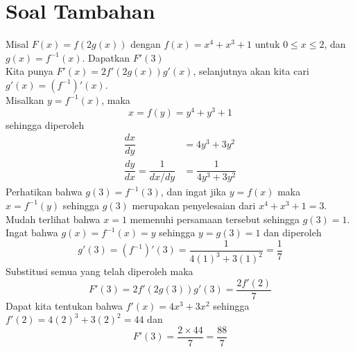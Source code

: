 \documentclass{article}
\begin{document}
\section*{Soal Tambahan}
Misal $F(x)=f(2g(x))$ dengan $f(x)=x^4+x^3+1$ untuk $0\leq x\leq 2$, dan $g(x)=f^{-1}(x)$. Dapatkan $F'(3)$\\
Kita punya $F'(x)=2f'(2g(x))g'(x)$, selanjutnya akan kita cari $g'(x)=(f^{-1})'(x)$. \\Misalkan $y=f^{-1}(x)$, maka $$ x=f(y)=y^4+y^3+1 $$
sehingga diperoleh
\begin{align*}
\dfrac{dx}{dy} &= 4y^3+3y^2\\
\dfrac{dy}{dx} = \dfrac{1}{dx/dy} &= \dfrac{1}{4y^3+3y^2}
\end{align*}
Perhatikan bahwa $g(3)=f^{-1}(3)$, dan ingat jika $y=f(x)$ maka $x=f^{-1}(y)$ sehingga $g(3)$ merupakan penyelesaian dari $x^4+x^3+1=3$. \\
Mudah terlihat bahwa $x=1$ memenuhi persamaan tersebut sehingga $g(3)=1$. \\
Ingat bahwa $g(x)=f^{-1}(x)=y$ sehingga $y=g(3)=1$ dan diperoleh 
$$ g'(3)=(f^{-1})'(3)=\dfrac{1}{4(1)^3+3(1)^2} = \dfrac{1}{7}$$ 
Substitusi semua yang telah diperoleh maka $$F'(3)=2f'(2g(3))g'(3) = \dfrac{2f'(2)}{7} $$
Dapat kita tentukan bahwa $f'(x)=4x^3+3x^2$ sehingga $f'(2)=4(2)^3+3(2)^2=44$ dan 
$$ F'(3) = \dfrac{2\times 44}{7} = \dfrac{88}{7} $$
\end{document}
